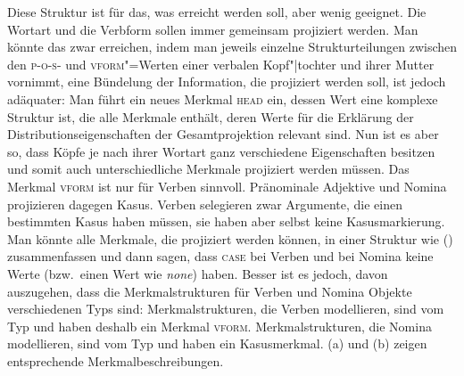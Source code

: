 \ea
\z
Diese Struktur ist für das, was erreicht werden soll, aber wenig geeignet.
Die Wortart und die Verbform sollen immer gemeinsam projiziert werden. Man könnte das zwar erreichen, indem man jeweils einzelne Strukturteilungen
zwischen den \textsc{p-o-s}- und \textsc{vform}"=Werten einer verbalen Kopf"|tochter und
ihrer Mutter vornimmt, eine Bündelung der Information, die projiziert werden soll,
ist jedoch adäquater: Man führt ein neues Merkmal \textsc{head} ein, dessen Wert
eine komplexe Struktur ist, die alle Merkmale enthält, deren Werte für die
Erklärung der Distributionseigenschaften\label{page-kopf-merkmal} der Gesamtprojektion relevant sind.
\ea
\z
Nun ist es aber so, dass Köpfe je nach ihrer Wortart ganz verschiedene Eigenschaften
besitzen und somit auch unterschiedliche Merkmale projiziert werden müssen.
Das Merkmal \textsc{vform} ist nur für Verben sinnvoll. Pränominale Adjektive und 
Nomina projizieren dagegen Kasus. Verben selegieren zwar Argumente, die einen
bestimmten Kasus haben müssen, sie haben aber selbst keine Kasusmarkierung.
Man könnte alle Merkmale, die projiziert werden können, in einer Struktur wie
() zusammenfassen und dann sagen, dass \textsc{case} bei Verben und \vform
bei Nomina keine Werte (bzw.\ einen Wert wie \emph{none}) haben.
\ea
\z
Besser ist es jedoch, davon auszugehen, dass die Merkmalstrukturen für
Verben und Nomina Objekte verschiedenen Typs sind: Merkmalstrukturen,
die Verben modellieren, sind vom Typ  und haben deshalb
ein Merkmal \textsc{vform}. Merkmalstrukturen, die Nomina modellieren,
sind vom Typ  und haben ein
Kasusmerkmal\label{page-ref-case-feat}. (a) und (b) zeigen entsprechende
Merkmalbeschreibungen.
\eal
\ex
{}
\ex
\zl

